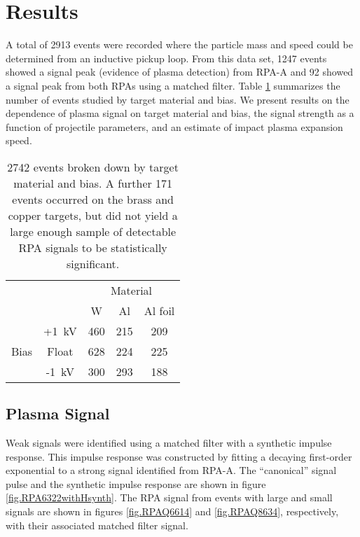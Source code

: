\section{Results}
\label{sec.Results}
A total of 2913 events were recorded where the particle mass and speed could be determined from an inductive pickup loop.  From this data set, 1247 events showed a signal peak (evidence of plasma detection) from RPA-A and 92 showed a signal peak from both RPAs using a matched filter.  Table \ref{tab.EventNumbers} summarizes the number of events studied by target material and bias.  We present results on the dependence of plasma signal on target material and bias, the signal strength as a function of projectile parameters, and an estimate of impact plasma expansion speed.

\begin{table}[\floatplace]
\begin{center}
\begin{tabular}{cc|ccc}
&&\multicolumn{3}{|c}{Material}\\
&&W&Al&Al foil\\
\hline
\multirow{3}{*}{\begin{sideways}Bias\end{sideways}}&+1~kV&460&215&209\\
  &Float&628&224&225\\
&-1~kV&300&293&188
\end{tabular}
\end{center}
\caption{\label{tab.EventNumbers} 2742 events broken down by target material and bias.  A further 171 events occurred on the brass and copper targets, but did not yield a large enough sample of detectable RPA signals to be statistically significant.}
\end{table}

\subsection{Plasma Signal}
Weak signals were identified using a matched filter with a synthetic impulse response.  This impulse response was constructed by fitting a decaying first-order exponential to a strong signal identified from RPA-A.  The ``canonical'' signal pulse and the synthetic impulse response are shown in figure \ref{fig.RPA6322withHsynth}.  The RPA signal from events with large and small signals are shown in figures \ref{fig.RPAQ6614} and \ref{fig.RPAQ8634}, respectively, with their associated matched filter signal.

